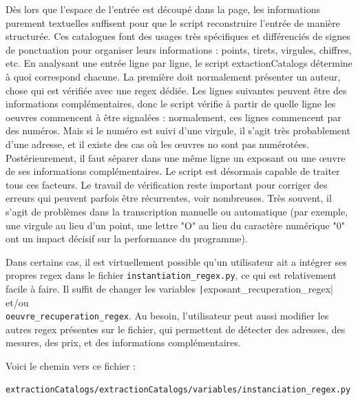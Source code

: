\documentclass[a4paper,12pt,twoside]{book}
\begin{document}
Dès lors que l'espace de l'entrée est découpé dans la page, les informations purement textuelles suffisent pour que le script reconstruire l'entrée de manière structurée. Ces catalogues font des usages très spécifiques et différenciés de signes de ponctuation pour organiser leurs informations : points, tirets, virgules, chiffres, etc. En analysant une entrée ligne par ligne, le script  extactionCatalogs détermine à quoi correspond chacune. La première doit normalement présenter un auteur, chose qui est vérifiée avec une regex  dédiée. Les lignes suivantes peuvent être des informations complémentaires, donc le script vérifie à partir de quelle ligne les oeuvres commencent à être signalées : normalement, ces lignes commencent par des numéros. Mais si le numéro est suivi d'une virgule, il s'agit très probablement d'une adresse, et il existe des cas où les œuvres no sont pas numérotées. Postérieurement, il faut séparer dans une même ligne un exposant ou une œuvre de ses informations complémentaires. Le script est désormais capable de traiter tous ces facteurs. Le travail de vérification reste important pour corriger des erreurs qui peuvent parfois être récurrentes, voir nombreuses. Très souvent, il s'agit de problèmes dans la transcription manuelle ou automatique (par exemple, une virgule au lieu d'un point, une lettre "O" au lieu du caractère numérique "0" ont un impact décisif sur la performance du programme). 

Dans certains cas, il est virtuellement possible qu'un utilisateur ait a intégrer ses propres regex dans le fichier \texttt{instantiation\_regex.py}, ce qui est relativement facile à faire. Il suffit de changer les variables \texttt|exposant_recuperation_regex| et/ou\\ \texttt{oeuvre\_recuperation\_regex}. Au besoin, l'utilisateur peut aussi modifier les autres regex présentes sur le fichier, qui permettent de détecter des adresses, des mesures, des prix, et des informations complémentaires.


Voici le chemin vers ce fichier : 

\begin{normalsize}
	\begin{verbatim}
extractionCatalogs/extractionCatalogs/variables/instanciation_regex.py
	\end{verbatim}
\end{normalsize}
\end{document}
